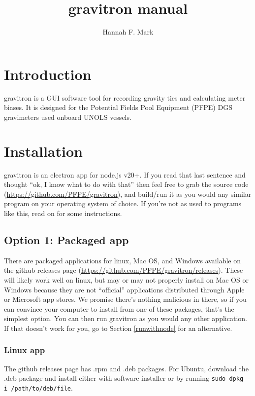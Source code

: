 \documentclass{pfpe-manual}
\title{gravitron manual}
\author{Hannah F. Mark}
\begin{document}
\maketitle

\tableofcontents
\newpage

\section{Introduction}

gravitron is a GUI software tool for recording gravity ties and calculating meter biases. It is designed for the Potential Fields Pool Equipment (PFPE) DGS gravimeters used onboard UNOLS vessels.

\section{Installation}
\label{install}
gravitron is an electron app for node.js v20+. If you read that last sentence and thought ``ok, I know what to do with that'' then feel free to grab the source code (\url{https://github.com/PFPE/gravitron}), and build/run it as you would any similar program on your operating system of choice. If you're not as used to programs like this, read on for some instructions.

\subsection{Option 1: Packaged app}
There are packaged applications for linux, Mac OS, and Windows available on the github releases page (\url{https://github.com/PFPE/gravitron/releases}). These will likely work well on linux, but may or may not properly install on Mac OS or Windows because they are not ``official'' applications distributed through Apple or Microsoft app stores. We promise there's nothing malicious in there, so if you can convince your computer to install from one of these packages, that's the simplest option. You can then run gravitron as you would any other application. If that doesn't work for you, go to Section \ref{runwithnode} for an alternative.

\subsubsection{Linux app}
The github releases page has .rpm and .deb packages. For Ubuntu, download the .deb package and install either with software installer or by running \texttt{sudo dpkg -i /path/to/deb/file}.
\end{document}
